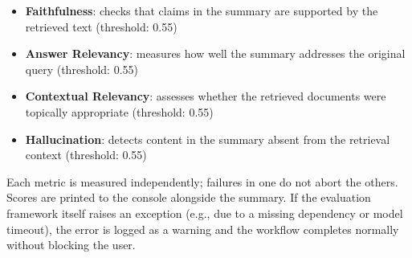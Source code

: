 \begin{itemize}
    \item \textbf{Faithfulness}: checks that claims in the summary are supported by the retrieved text (threshold: 0.55)
    \item \textbf{Answer Relevancy}: measures how well the summary addresses the original query (threshold: 0.55)
    \item \textbf{Contextual Relevancy}: assesses whether the retrieved documents were topically appropriate (threshold: 0.55)
    \item \textbf{Hallucination}: detects content in the summary absent from the retrieval context (threshold: 0.55)
\end{itemize}

Each metric is measured independently; failures in one do not abort the others. Scores are printed to the console alongside the summary. If the evaluation framework itself raises an exception (e.g., due to a missing dependency or model timeout), the error is logged as a warning and the workflow completes normally without blocking the user.
